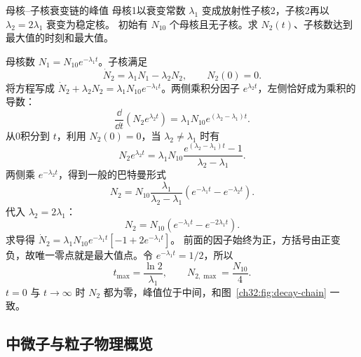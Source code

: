 \begin{origexamplebox}{母核--子核衰变链的峰值}
母核1以衰变常数 $\lambda_1$ 变成放射性子核2，子核2再以 $\lambda_2=2\lambda_1$ 衰变为稳定核。
初始有 $N_{10}$ 个母核且无子核。求 $N_2(t)$、子核数达到最大值的时刻和最大值。
\end{origexamplebox}
\begin{xesolution}

\begin{center}

\label{ch32:fig:decay-chain}
\end{center}


母核数 $N_1=N_{10}e^{-\lambda_1t}$。子核满足
\[
 \dot N_2=\lambda_1N_1-\lambda_2N_2,
 \qquad N_2(0)=0.
\]
将方程写成 $\dot N_2+\lambda_2N_2=\lambda_1N_{10}e^{-\lambda_1t}$。两侧乘积分因子 $e^{\lambda_2t}$，左侧恰好成为乘积的导数：
\[
 \frac{\dd}{\dd t}(N_2e^{\lambda_2t})=\lambda_1N_{10}e^{(\lambda_2-\lambda_1)t}.
\]
从0积分到 $t$，利用 $N_2(0)=0$，当 $\lambda_2\ne\lambda_1$ 时有
\[
 N_2e^{\lambda_2t}=\lambda_1N_{10}\frac{e^{(\lambda_2-\lambda_1)t}-1}{\lambda_2-\lambda_1}.
\]
两侧乘 $e^{-\lambda_2t}$，得到一般的巴特曼形式
\[
 N_2=N_{10}\frac{\lambda_1}{\lambda_2-\lambda_1}
 \left(e^{-\lambda_1t}-e^{-\lambda_2t}\right).
\]
代入 $\lambda_2=2\lambda_1$：
\[
 \boxed{N_2=N_{10}\left(e^{-\lambda_1t}-e^{-2\lambda_1t}\right)}.
\]
求导得 $\dot N_2=\lambda_1N_{10}e^{-\lambda_1t}[-1+2e^{-\lambda_1t}]$。
前面的因子始终为正，方括号由正变负，故唯一零点就是最大值点。令 $e^{-\lambda_1t}=1/2$，所以
\[
 \boxed{t_{\max}=\frac{\ln2}{\lambda_1}},
 \qquad \boxed{N_{2,\max}=\frac{N_{10}}4}.
\]
$t=0$ 与 $t\to\infty$ 时 $N_2$ 都为零，峰值位于中间，和图~\ref{ch32:fig:decay-chain} 一致。
\end{xesolution}


\subsection{中微子与粒子物理概览}



